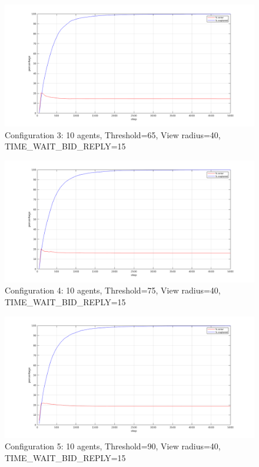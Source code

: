 \documentclass[a4paper, 10pt, conference]{ieeeconf}      %
\begin{document}
\begin{figure}[H]
	\centering
	\includegraphics[width=1\linewidth]{img/config3.png}
	\caption{Configuration 3: 10 agents, Threshold=65, View radius=40, TIME\_WAIT\_BID\_REPLY=15}
	\label{fig:config3}
\end{figure}
\begin{figure}[H]
	\centering
	\includegraphics[width=1\linewidth]{img/config4.png}
	\caption{Configuration 4: 10 agents, Threshold=75, View radius=40, TIME\_WAIT\_BID\_REPLY=15}
	\label{fig:config4}
\end{figure}
\begin{figure}[H]
	\centering
	\includegraphics[width=1\linewidth]{img/config5.png}
	\caption{Configuration 5: 10 agents, Threshold=90, View radius=40, TIME\_WAIT\_BID\_REPLY=15}
	\label{fig:config5}
\end{figure}
\end{document}
